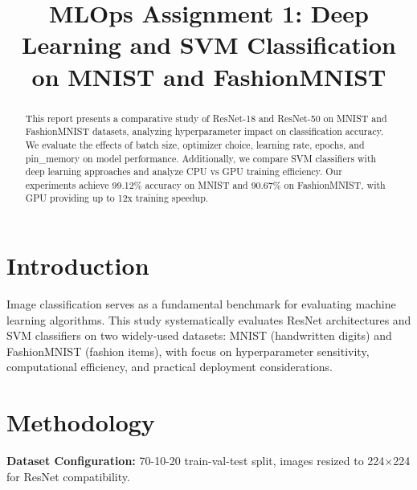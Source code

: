 \documentclass[conference]{IEEEtran}
\title{MLOps Assignment 1: Deep Learning and SVM Classification on MNIST and FashionMNIST}
\author{\IEEEauthorblockN{Tejas Gupta}
\IEEEauthorblockA{B22CS093\\Indian Institute of Technology Jodhpur}}
\begin{document}
\maketitle

\begin{center}
\end{center}

\begin{abstract}
This report presents a comparative study of ResNet-18 and ResNet-50 on MNIST and FashionMNIST datasets, analyzing hyperparameter impact on classification accuracy. We evaluate the effects of batch size, optimizer choice, learning rate, epochs, and pin\_memory on model performance. Additionally, we compare SVM classifiers with deep learning approaches and analyze CPU vs GPU training efficiency. Our experiments achieve 99.12\% accuracy on MNIST and 90.67\% on FashionMNIST, with GPU providing up to 12x training speedup.
\end{abstract}

\section{Introduction}
Image classification serves as a fundamental benchmark for evaluating machine learning algorithms. This study systematically evaluates ResNet architectures and SVM classifiers on two widely-used datasets: MNIST (handwritten digits) and FashionMNIST (fashion items), with focus on hyperparameter sensitivity, computational efficiency, and practical deployment considerations.

\section{Methodology}
\textbf{Dataset Configuration:} 70-10-20 train-val-test split, images resized to 224$\times$224 for ResNet compatibility.
\end{document}

